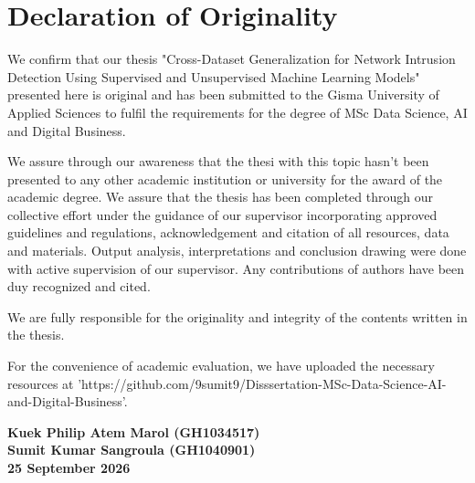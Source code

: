 \chapter*{Declaration of Originality}

We confirm that our thesis "Cross-Dataset Generalization for Network Intrusion Detection Using Supervised and Unsupervised Machine Learning Models" presented here is original
and has been submitted to the Gisma University of Applied Sciences to fulfil the requirements for the degree of MSc Data Science, AI and Digital Business.

We assure through our awareness that the thesi with this topic hasn't been presented to any other academic institution or university for the award of the academic degree. We assure that
the thesis has been completed through our collective effort under the guidance of our supervisor incorporating approved guidelines and regulations, acknowledgement and citation of all 
resources, data and materials. Output analysis, interpretations and conclusion drawing were done with active supervision of our supervisor. Any contributions of authors have been duy 
recognized and cited.

We are fully responsible for the originality and integrity of the contents written in the thesis.

For the convenience of academic evaluation, we have uploaded the necessary resources at 'https://github.com/9sumit9/Disssertation-MSc-Data-Science-AI-and-Digital-Business'.

\noindent\textbf{Kuek Philip Atem Marol (GH1034517)}\ \\
\textbf{Sumit Kumar Sangroula (GH1040901)}\ \\
\textbf{25 September 2026}

